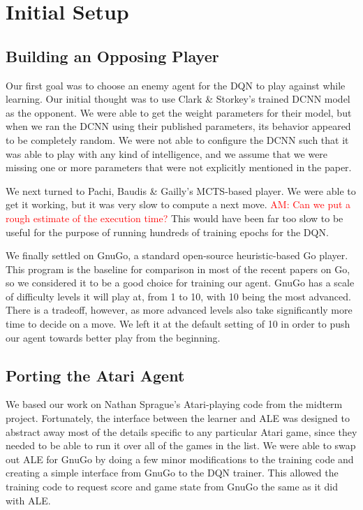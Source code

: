\section{Initial Setup}

\subsection*{Building an Opposing Player}

Our first goal was to choose an enemy agent for the DQN to play against while learning. Our initial thought was to use Clark \& Storkey's trained DCNN model as the opponent. We were able to get the weight parameters for their model, but when we ran the DCNN using their published parameters, its behavior appeared to be completely random. We were not able to configure the DCNN such that it was able to play with any kind of intelligence, and we assume that we were missing one or more parameters that were not explicitly mentioned in the paper.

We next turned to Pachi, Baudis \& Gailly's MCTS-based player. We were able to get it working, but it was very slow to compute a next move. \textcolor{red}{AM: Can we put a rough estimate of the execution time?} This would have been far too slow to be useful for the purpose of running hundreds of training epochs for the DQN.

We finally settled on GnuGo, a standard open-source heuristic-based Go player. This program is the baseline for comparison in most of the recent papers on Go, so we considered it to be a good choice for training our agent. GnuGo has a scale of difficulty levels it will play at, from 1 to 10, with 10 being the most advanced. There is a tradeoff, however, as more advanced levels also take significantly more time to decide on a move. We left it at the default setting of 10 in order to push our agent towards better play from the beginning.

\subsection*{Porting the Atari Agent}

We based our work on Nathan Sprague's Atari-playing code from the midterm project. Fortunately, the interface between the learner and ALE was designed to abstract away most of the details specific to any particular Atari game, since they needed to be able to run it over all of the games in the list. We were able to swap out ALE for GnuGo by doing a few minor modifications to the training code and creating a simple interface from GnuGo to the DQN trainer. This allowed the training code to request score and game state from GnuGo the same as it did with ALE.

